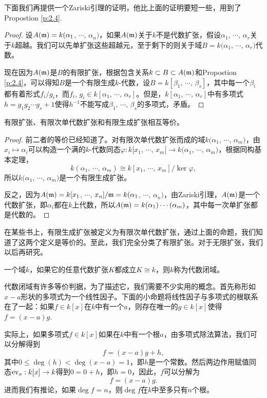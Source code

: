 下面我们再提供一个Zariski引理的证明，他比上面的证明要短一些，用到了Propostion \ref{p:2.4}.

\begin{proof} 设$A(\mathfrak{m})=k(\alpha_1$, $\cdots$, $\alpha_n)$，如果$A(\mathfrak{m})$关于$k$不是代数扩张，假设$\alpha_1$, $\cdots$, $\alpha_r$关于$k$超越。我们可以先单扩张这些超越元，至于剩下的则关于域$B=k(\alpha_1$, $\cdots$, $\alpha_r)$代数。

现在因为$A(\mathfrak{m})$是$B$的有限扩张，根据包含关系$k\subset B\subset A(\mathfrak{m})$和Propostion \ref{p:2.4}，可以得知$B$是一个有限生成$k$-代数，设$B=k[\beta_1,\,\cdots\!,\,\beta_s]$，其中每一个$\beta_i$都有着形式$f_i/g_i$，而$f_i$, $g_i\in k[\alpha_1,\,\cdots\!,\,\alpha_r]$。但是，$k[\alpha_1,\,\cdots\!,\,\alpha_r]$中有多项式$h=g_1g_2\cdots g_{s}+1$使得$h^{-1}$不能写成$\beta_1,\,\cdots\!,\,\beta_s$的多项式，矛盾。\end{proof}

\begin{pro}
有限扩张、有限次单代数扩张和有限生成扩张相互等价。
\end{pro}

\begin{proof} 前二者的等价已经知道了。对有限次单代数扩张而成的域$k(\alpha_1$, $\cdots$, $\alpha_m)$，由$x_i\mapsto \alpha_i$可以构造一个满的$k$-代数同态$\varphi:k[x_1$, $\cdots$, $x_m]\to k(\alpha_1$, $\cdots$, $\alpha_m)$，根据同构基本定理，
\[
	k(\alpha_1,\,\cdots\!,\,\alpha_m)\cong k[x_1,\,\cdots\!,\,x_m]/\ker \varphi,
\]
所以$k(\alpha_1$, $\cdots$, $\alpha_m)$是一个有限生成扩张。

反之，因为$A(\mathfrak{m})=k[x_1$, $\cdots$, $x_n]/\mathfrak{m}=k(\alpha_1$, $\cdots$, $\alpha_n)$，由Zariski引理，$A(\mathfrak{m})$是一个代数扩张，即$\alpha_i$都在$k$上代数，所以$A(\mathfrak{m})=k(\alpha_1)\cdots(\alpha_m)$，其中每一次单扩张都是代数的。\end{proof}

在某些书上，有限生成扩张被定义为有限次单代数扩张，通过上面的命题，我们知道了这两个定义是等价的。至此，我们完全分类了有限扩张。对于无限扩张，我们以后再研究。

\begin{para}
一个域$k$，如果它的任意代数扩张$K$都成立$K\cong k$，则$k$称为代数闭域。
\end{para}

代数闭域有许多等价判据，为了描述它，我们需要不少实用的概念。首先称形如$x-a$形状的多项式为一个线性因子。下面的小命题将线性因子与多项式的根联系在了一起：如果$f\in k[x]$在$k$中有一个$a$，则存在唯一的$g\in k[x]$使得$f=(x-a)g$.

实际上，如果多项式$f\in k[x]$如果在$k$中有一个根$a$，由多项式除法算法，我们可以分解得到
\[
	f=(x-a)g+h,
\]
其中$0\leq \deg(h)<\deg(x-a)=1$，即$h$是一个常数。然后两边作用赋值同态$\operatorname{ev}_a:k[x]\to k$得到$0=0+h$，即$h=0$，因此，$f$可以分解为
\[
	f=(x-a)g.
\]
进而我们有推论，如果$\deg f=n$，则$\deg f$在$k$中至多只有$n$个根。


